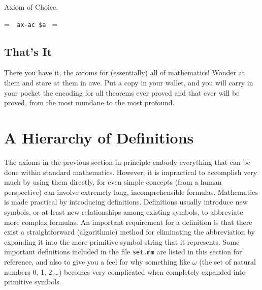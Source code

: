 \noindent Axiom of Choice.

\setbox\startprefix=\hbox{\tt \ \ ax-ac\ \$a\ }
\setbox\contprefix=\hbox{\tt \ \ \ \ \ \ \ \ \ \ \ \ \ \ }
\startm
\m{\vdash}\m{\exists}\m{\forall}\m{\forall}\m{(}\m{(}\m{%
\in}\m{\wedge}\m{\in}\m{)}\m{\rightarrow}\m{\exists}\m{%
\forall}\m{(}\m{\exists}\m{(}\m{(}\m{\in}\m{\wedge}%
\m{\in}\m{)}\m{\wedge}\m{(}\m{\in}\m{\wedge}\m{\in}%
\m{)}\m{)}\m{\leftrightarrow}\m{=}\m{)}\m{)}
\endm

\subsection{That's It}

There you have it, the axioms for (essentially) all of mathematics!
Wonder at them and stare at them in awe.  Put a copy in your wallet, and
you will carry in your pocket the encoding for all theorems ever proved
and that ever will be proved, from the most mundane to the most
profound.

\section{A Hierarchy of Definitions}\label{hierarchy}

The axioms in the previous section in principle embody everything that can be
done within standard mathematics.  However, it is impractical to accomplish
very much by using them directly, for even simple concepts (from a human
perspective) can involve extremely long, incomprehensible formulas.
Mathematics is made practical by introducing definitions.
Definitions usually introduce new symbols, or at least new relationships among
existing symbols, to abbreviate more complex formulas.  An important
requirement for a definition is that there exist a straightforward
(algorithmic) method for eliminating the abbreviation by expanding it into the
more primitive symbol string that it represents.  Some
important definitions included in
the file \texttt{set.mm} are listed in this section for reference, and also to
give you a feel for why something like $\omega$ (the
set of natural numbers 0, 1, 2,\ldots) becomes very
complicated when completely expanded into primitive symbols.

